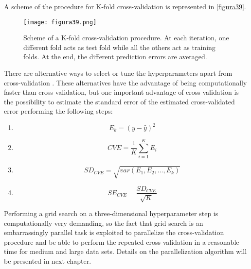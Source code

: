 \vspace{20pt}
A scheme of the procedure for K-fold cross-validation is represented in \autoref{figura39}.

\begin{figure}[hbtp]
\centering
\texttt{[image: figura39.png]}
\caption[Scheme of a K-fold cross-validation procedure]{Scheme of a K-fold cross-validation procedure. At each iteration, one different fold acts as test fold while all the others act as training folds. At the end, the different prediction errors are averaged.}
\label{figura39}
\end{figure}


There are alternative ways to select or tune the hyperparameters apart from cross-validation \parencite{vujavcic2015computationally, zhang2010regularization}. These alternatives have the advantage of being computationally faster than cross-validation, but one important advantage of cross-validation is the possibility to estimate the standard error of the estimated cross-validated error performing the following steps: 

\vspace{15pt}
\begin{enumerate}
    \item \begin{equation}
    E_k=(y - \hat{y})^2
    \end{equation}
    \item \begin{equation}
    CVE=\frac{1}{K}\sum_{i=1}^{K}E_i
    \end{equation}
    \item \begin{equation}
    SD_{CVE}=\sqrt{var(E_1, E_2, \dots, E_k)}
    \end{equation}
    \item \begin{equation}
    SE_{CVE}=\frac{SD_{CVE}}{\sqrt{K}}
    \end{equation}
\label{secve}
\end{enumerate}

Performing a grid search on a three-dimensional hyperparameter step is computationally very demanding, so the fact that grid search is an embarrassingly parallel task \parencite{mcgibbon2016osprey} is exploited to parallelize the cross-validation procedure and be able to perform the repeated cross-validation in a reasonable time for medium and large data sets. Details on the parallelization algorithm will be presented in next chapter.
